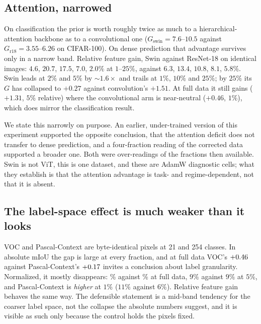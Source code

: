 \subsection{Attention, narrowed}\label{sec:denseattn}
On classification the prior is worth roughly twice as much to a
hierarchical-attention backbone as to a convolutional one ($G_{\mathrm{swin}} =
7.6$--$10.5$ against $G_{\mathrm{r18}} = 3.55$--$6.26$ on CIFAR-100). On dense
prediction that advantage survives only in a narrow band. Relative feature
gain, Swin against ResNet-18 on identical images: $4.6$, $20.7$, $17.5$, $7.0$,
$2.0\%$ at $1$--$25\%$, against $6.3$, $13.4$, $10.8$, $8.1$, $5.8\%$. Swin
leads at $2\%$ and $5\%$ by ${\sim}1.6\times$ and trails at $1\%$, $10\%$ and
$25\%$; by $25\%$ its $G$ has collapsed to $+0.27$ against convolution's
$+1.51$. At full data it still gains ($+1.31$, $5\%$ relative) where the
convolutional arm is near-neutral ($+0.46$, $1\%$), which does mirror the
classification result.

We state this narrowly on purpose. An earlier, under-trained version of this
experiment supported the opposite conclusion, that the attention deficit does
not transfer to dense prediction, and a four-fraction reading of the corrected
data supported a broader one. Both were over-readings of the fractions then
available. Swin is not ViT, this is one dataset, and these are AdamW diagnostic
cells; what they establish is that the attention advantage is task- and
regime-dependent, not that it is absent.

\subsection{The label-space effect is much weaker than it looks}
VOC and Pascal-Context are byte-identical pixels at 21 and 254 classes. In
absolute mIoU the gap is large at every fraction, and at full data VOC's
$+0.46$ against Pascal-Context's $+0.17$ invites a conclusion
about label granularity. Normalized, it mostly disappears: \denseVocFullRel\%
against \densePcFullRel\% at full data, $9\%$ against $9\%$ at $5\%$, and
Pascal-Context is \emph{higher} at $1\%$ ($11\%$ against $6\%$). Relative
feature gain behaves the same way. The defensible statement is a mid-band
tendency for the coarser label space, not the collapse the absolute numbers
suggest, and it is visible as such only because the control holds the pixels
fixed.

